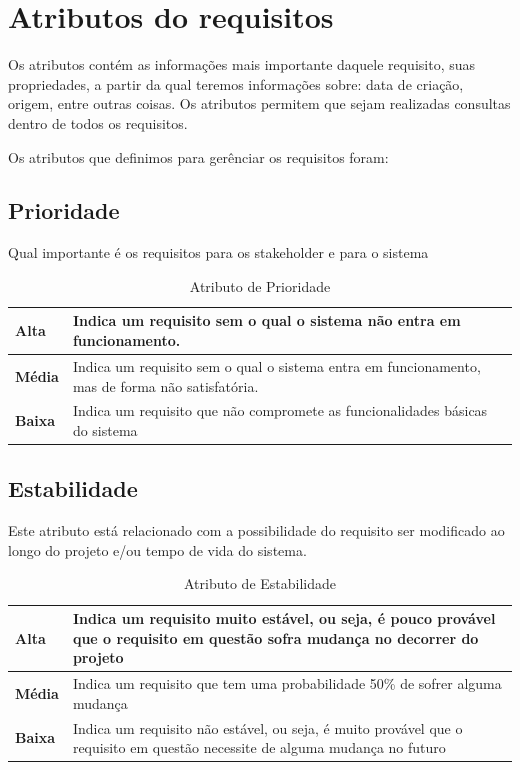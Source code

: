 \section{Atributos do requisitos}

  Os atributos contém as informações mais importante daquele requisito, suas propriedades, a partir da qual teremos informações sobre:
  data de criação, origem, entre outras coisas. Os atributos permitem que sejam realizadas consultas dentro de todos os requisitos.

  Os atributos que definimos para gerênciar os requisitos foram:

\subsection{Prioridade}

  Qual importante é os requisitos para os stakeholder e para o sistema

  \begin{table}[!htb]
    \centering
    \begin{tabular}{p{5cm}p{10cm}}
      \toprule
      \textbf{Alta}  & Indica um requisito sem o qual o sistema não entra em funcionamento.                             \\ \midrule
      \textbf{Média} & Indica um requisito sem o qual o sistema entra em funcionamento, mas de forma não satisfatória.  \\ \midrule
      \textbf{Baixa} & Indica um requisito que não compromete as funcionalidades básicas do sistema                     \\
      \bottomrule
    \end{tabular}
    \caption{Atributo de Prioridade}
  \end{table}

\subsection{Estabilidade}

  Este atributo está relacionado com a possibilidade do requisito ser modificado ao longo do projeto e/ou tempo de vida do sistema.

  \begin{table}[!htb]
    \centering
    \begin{tabular}{p{5cm}p{10cm}}
      \toprule
      \textbf{Alta}  & Indica um requisito muito estável, ou seja, é pouco provável que o requisito em questão sofra
                       mudança no decorrer do projeto                                                                       \\ \midrule
      \textbf{Média} & Indica um requisito que tem uma probabilidade 50\% de sofrer alguma mudança                          \\ \midrule
      \textbf{Baixa} & Indica um requisito não estável, ou seja, é muito provável que o requisito em questão necessite
                       de alguma mudança no futuro                                                                          \\
      \bottomrule
    \end{tabular}
    \caption{Atributo de Estabilidade}
  \end{table}

